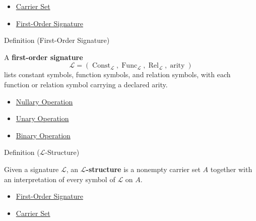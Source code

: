 \begin{dependencies}
\begin{itemize}
  \item \hyperref[def:carrier-set]{Carrier Set}
  \item \hyperref[def:signature]{First-Order Signature}
\end{itemize}
\end{dependencies}

\begin{definitionbox}{Definition (First-Order Signature)}
\begin{definition}
\label{def:signature}
A \textbf{first-order signature}
\[
  \mathcal L=(\operatorname{Const}_{\mathcal L},
  \operatorname{Func}_{\mathcal L},
  \operatorname{Rel}_{\mathcal L},\operatorname{arity})
\]
lists constant symbols, function symbols, and relation symbols, with each
function or relation symbol carrying a declared arity.
\end{definition}
\end{definitionbox}

\begin{dependencies}
\begin{itemize}
  \item \hyperref[def:nullary]{Nullary Operation}
  \item \hyperref[def:unary]{Unary Operation}
  \item \hyperref[def:binop]{Binary Operation}
\end{itemize}
\end{dependencies}

\begin{definitionbox}{Definition ($\mathcal L$-Structure)}
\begin{definition}
\label{def:l-structure}
Given a signature $\mathcal L$, an \textbf{$\mathcal L$-structure} is a
nonempty carrier set $A$ together with an interpretation of every symbol of
$\mathcal L$ on $A$.
\end{definition}
\end{definitionbox}

\begin{dependencies}
\begin{itemize}
  \item \hyperref[def:signature]{First-Order Signature}
  \item \hyperref[def:carrier-set]{Carrier Set}
\end{itemize}
\end{dependencies}
